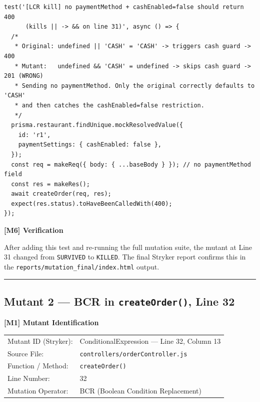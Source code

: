 \documentclass[12pt, a4paper]{article}
\begin{document}
\begin{lstlisting}[caption={Test that kills Mutant 1}]
test('[LCR kill] no paymentMethod + cashEnabled=false should return 400
      (kills || -> && on line 31)', async () => {
  /*
   * Original: undefined || 'CASH' = 'CASH' -> triggers cash guard -> 400
   * Mutant:   undefined && 'CASH' = undefined -> skips cash guard -> 201 (WRONG)
   * Sending no paymentMethod. Only the original correctly defaults to 'CASH'
   * and then catches the cashEnabled=false restriction.
   */
  prisma.restaurant.findUnique.mockResolvedValue({
    id: 'r1',
    paymentSettings: { cashEnabled: false },
  });
  const req = makeReq({ body: { ...baseBody } }); // no paymentMethod field
  const res = makeRes();
  await createOrder(req, res);
  expect(res.status).toHaveBeenCalledWith(400);
});
\end{lstlisting}

\textbf{[M6] Verification}

After adding this test and re-running the full mutation suite, the mutant at Line 31 changed from \texttt{SURVIVED} to \texttt{KILLED}. The final Stryker report confirms this in the \texttt{reports/mutation\_final/index.html} output.

\bigskip\hrule\bigskip

\subsection*{Mutant 2 --- BCR in \texttt{createOrder()}, Line 32}

\begin{mutantbox}
\textbf{[M1] Mutant Identification}\\[4pt]
\begin{tabular}{ll}
Mutant ID (Stryker):    & ConditionalExpression --- Line 32, Column 13 \\
Source File:            & \texttt{controllers/orderController.js} \\
Function / Method:      & \texttt{createOrder()} \\
Line Number:            & 32 \\
Mutation Operator:      & BCR (Boolean Condition Replacement) \\
\end{tabular}
\end{mutantbox}

\bigskip
\end{document}
